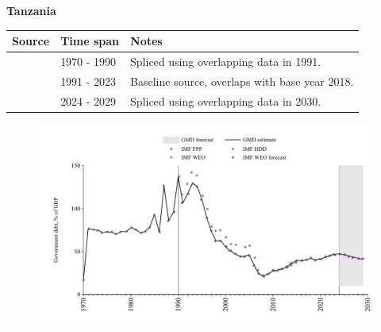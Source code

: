 \documentclass[12pt,a4paper,landscape]{article}
\begin{document}
\begin{adjustbox}{max totalsize={\paperwidth}{\paperheight},center}
\begin{minipage}[t][\textheight][t]{\textwidth}
\vspace*{0.5cm}
{}
\begin{center}
{\Large\bfseries Tanzania}
\end{center}
\vspace{0.5cm}
\begin{table}[H]
\centering
\small
\begin{tabular}{|l|l|l|}
\hline
\textbf{Source} & \textbf{Time span} & \textbf{Notes} \\
\hline
\rowcolor{white}\cite{IMF_HDD}& 1970 - 1990 &Spliced using overlapping data in 1991.\\
\rowcolor{lightgray}\cite{IMF_FPP}& 1991 - 2023 &Baseline source, overlaps with base year 2018.\\
\rowcolor{white}\cite{IMF_WEO_forecast}& 2024 - 2029 &Spliced using overlapping data in 2030.\\
\hline
\end{tabular}
\end{table}
\begin{figure}[H]
\centering
\includegraphics[width=\textwidth,height=0.6\textheight,keepaspectratio]{graphs/TZA_govdebt_GDP.pdf}
\end{figure}
\end{minipage}
\end{adjustbox}
\end{document}
